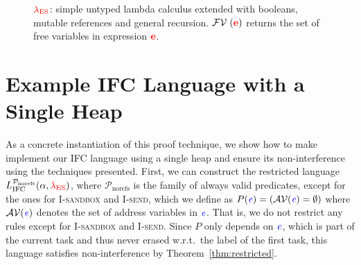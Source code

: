 \documentclass{llncs}
\newcommand{\Varid}[1]{\mathit{#1}}
\newcommand{\Red}[1]{{\color{red} #1}}
\begin{document}
\begin{figure}

\caption{\ensuremath{\Red{\lambda_{\text{ES}}}}: simple untyped lambda calculus extended with booleans,
mutable references and general recursion. \ensuremath{\mathcal{FV}\;(\tar{e})} returns the set of free
variables in expression \ensuremath{\tar{e}}.}
\label{fig:ml-full}
\end{figure}



\section{Example IFC Language with a Single Heap}
\label{sec:single-heap}

As a concrete instantiation of this proof technique, we show
how to make implement our IFC language using a single heap and
ensure its non-interference using the techniques presented.
First, we can construct the restricted language
\ensuremath{L_\text{IFC}^{\mathcal{P}_\text{norefs}}(\alpha,\Red{\lambda_{\text{ES}}})}, where \ensuremath{\mathcal{P}_\text{norefs}} is
the family of always valid predicates, except for the ones for
\textsc{I-sandbox} and \textsc{I-send}, which we define as
$ P(\ensuremath{\ifc{\Varid{e}}}) = (\mathcal{AV}(\ensuremath{\ifc{\Varid{e}}}) = \emptyset{}) $
where $\mathcal{AV}(\ensuremath{\ifc{\Varid{e}}})$ denotes the set of address variables in \ensuremath{\ifc{\Varid{e}}}.
That is, we do not restrict any rules except for \textsc{I-sandbox}
and \textsc{I-send}.
Since $P$ only depends on \ensuremath{\ifc{\Varid{e}}}, which is part of the current
task and thus never erased w.r.t.\ the label of the first task,
this language satisfies non-interference by Theorem~\ref{thm:restricted}.
\end{document}

